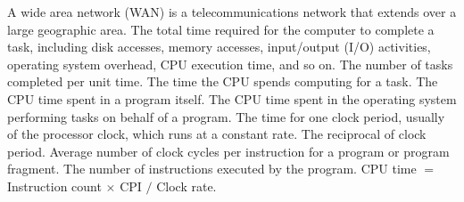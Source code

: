 \documentclass[a4paper,12pt]{report}
\begin{document}
A wide area network (WAN) is a telecommunications network that extends over a large geographic area.
The total time required for the computer to complete a task, including disk accesses, memory accesses, input/output (I/O) activities, operating system overhead, CPU execution time, and so on.
The number of tasks completed per unit time.
The time the CPU spends computing for a task.
The CPU time spent in a program itself.
The CPU time spent in the operating system performing tasks on behalf of a program.
The
time for one clock period, usually of the processor clock, which
runs at a constant rate.
The reciprocal of clock period.
Average number of clock cycles per instruction for a program or
program fragment.
The number of instructions executed by the program.
CPU time $=$ Instruction count $\times$ CPI $/$ Clock rate.
\end{document}
